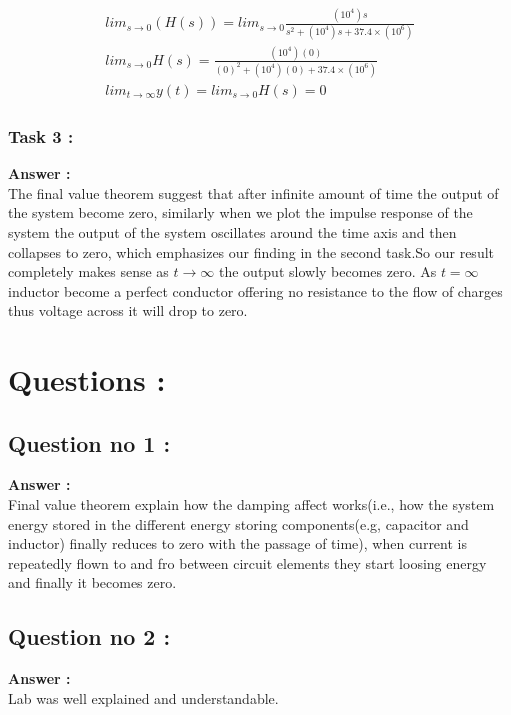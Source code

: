 \documentclass[11pt]{article}
\begin{document}
\begin{align*}
lim_{s\to 0}(H(s)) = lim_{s\to 0}\frac{(10^4)s}{s^2 +{(10^{4})s}+{37.4\times(10^{6})}}
\\lim_{s\to 0}H(s) = \frac{(10^4)(0)}{(0)^2 +{(10^{4})(0)}+{37.4\times(10^{6})}}
\\lim_{t \to \infty}y(t)=lim_{s\to 0}H(s) = 0
\end{align*}
\subsubsection{Task 3 :}
\textbf{Answer :}
\\The final value theorem suggest that after infinite amount of time the output of the system become zero, similarly when we plot the impulse response of the system the output of the system oscillates around the time axis and then collapses to zero, which emphasizes our finding in the second task.So our result completely makes sense as $t \to \infty$ the output slowly becomes zero. As $t=\infty$ inductor become a perfect conductor offering no resistance to the flow of charges thus voltage across it will drop to zero. 

\section{Questions :}
{\subsection{Question no 1 :} }

\textbf{Answer :} 
\\Final value theorem explain how the damping affect works(i.e., how the system energy stored in the different energy storing components(e.g, capacitor and inductor) finally reduces to zero with the passage of time), when current is repeatedly flown to and fro between circuit elements they start loosing energy and finally it becomes zero.

{\subsection{Question no 2 :} }
\textbf{Answer :}
\\Lab was well explained and understandable.
\end{document}
